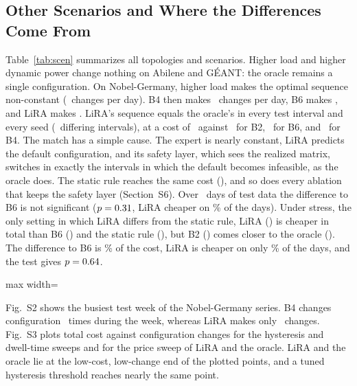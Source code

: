 \documentclass[5p,times]{elsarticle}
\begin{document}
\subsection{Other Scenarios and Where the Differences Come From}

Table~\ref{tab:scen} summarizes all topologies and scenarios. Higher load and higher dynamic power change nothing on Abilene and G\'{E}ANT: the oracle remains a single configuration. On Nobel-Germany, higher load makes the optimal sequence non-constant (\nobhlOchg\ changes per day). B4 then makes \nobhlBFourchg\ changes per day, B6 makes \nobhlBsixChg, and LiRA makes \nobhlLiRAchg. LiRA's sequence equals the oracle's in every test interval and every seed (\hlLiraOracleDiff\ differing intervals), at a cost of \nobJLiRAhl\ against \nobJBtwohl\ for B2, \nobJBsixhl\ for B6, and \nobhlJBFour\ for B4. The match has a simple cause. The expert is nearly constant, LiRA predicts the default configuration, and its safety layer, which sees the realized matrix, switches in exactly the intervals in which the default becomes infeasible, as the oracle does. The static rule reaches the same cost (\staticJhl), and so does every ablation that keeps the safety layer (Section~S6). Over \nobTestDays\ days of test data the difference to B6 is not significant ($p=0.31$, LiRA cheaper on \effBsixDayshl\% of the days). Under stress, the only setting in which LiRA differs from the static rule, LiRA (\nobJLiRAst) is cheaper in total than B6 (\nobJBsixst) and the static rule (\staticJst), but B2 (\nobJBtwost) comes closer to the oracle (\nobJOst). The difference to B6 is \nobstGainPct\% of the cost, LiRA is cheaper on only \nobstBsixDays\% of the days, and the test gives $p=0.64$.

\begin{table}[t]
\centering
\caption{All Topologies and Scenarios: Configuration Changes per Day, Total Cost $J$, and Holm-Adjusted $p$-Values of the Wilcoxon Test on Per-Day Cost (B4, B6, and LiRA: Mean over Five Seeds)}
\label{tab:scen}
\footnotesize
\setlength{\tabcolsep}{3.5pt}
\begin{adjustbox}{max width=\linewidth}\end{adjustbox}
\end{table}

Fig.~S2 shows the busiest test week of the Nobel-Germany series. B4 changes configuration \caseBFourchg\ times during the week, whereas LiRA makes only \caseLiRAchg\ changes. Fig.~S3 plots total cost against configuration changes for the hysteresis and dwell-time sweeps and for the price sweep of LiRA and the oracle. LiRA and the oracle lie at the low-cost, low-change end of the plotted points, and a tuned hysteresis threshold reaches nearly the same point.
\end{document}
